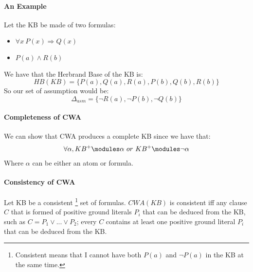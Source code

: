 \documentclass[10pt,a4paper]{article}
\begin{document}
\paragraph{An Example}
Let the KB be made of two formulas:
\begin{itemize}
\item $\forall x\ P(x) \Rightarrow Q(x)$
\item $P(a)\wedge R(b)$
\end{itemize}
We have that the Herbrand Base of the KB is:
\[HB(KB)=\lbrace P(a), Q(a), R(a), P(b), Q(b), R(b) \rbrace\]
So our set of assumption would be:
\[\Delta_{asm}=\lbrace \neg R(a), \neg P(b), \neg Q(b) \rbrace\]


\paragraph{Completeness of CWA}
We can show that CWA produces a complete KB since we have that:
\[\forall \alpha, KB^+ \modules \alpha\ or\ KB^+ \modules \neg \alpha\]
Where $\alpha$ can be either an atom or formula. 

\paragraph{Consistency of CWA}
Let KB be a consistent \footnote{Consistent means that I cannot have both $P(a)$ and $\neg P(a)$ in the KB at the same time.} set of formulas. $CWA(KB)$ is consistent iff any clause $C$ that
is formed of positive ground literals $P_i$ that can be deduced from the KB, such as $C=P_1\vee...\vee P_2$; every $C$ contains at least one positive ground literal $P_i$ that can be deduced from the KB.
\end{document}
